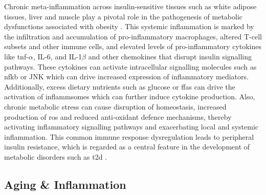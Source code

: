 \par Chronic meta-inflammation across insulin-sensitive tissues such as white adipose tissues, liver and muscle play a pivotal role in the pathogenesis of metabolic dysfunctions associated with obesity \textbf{\cite{gregor_inflammatory_2011,hotamisligil_inflammation_2017}}. This systemic inflammation is marked by the infiltration and accumulation of pro-inflammatory macrophages, altered T-cell subsets and other immune cells, and elevated levels of pro-inflammatory cytokines like \gls{tnf}-$\alpha$, IL-6, and IL-1$\beta$ and other chemokines that disrupt insulin signalling pathways. These cytokines can activate intracellular signalling molecules such as \gls{nfkb} or JNK which can drive increased expression of inflammatory mediators. Additionally, excess dietary nutrients such as glucose or \glspl{ffa} can drive the activation of inflammsomes which can further induce cytokine production. Also, chronic metabolic stress can cause disruption of  homeostasis, increased production of \gls{ros} and reduced anti-oxidant defence mechanisms, thereby activating inflammatory signalling pathways and exacerbating local and systemic inflammation. This common immune response dysregulation leads to peripheral insulin resistance, which is regarded as a central feature in the development of metabolic disorders such as \gls{t2d} \textbf{\cite{greenberg_obesity_2006,wu_metabolic_2020,luo_inflammation_2020,kawai_adipose_2021,kim_metabolic_2021,rohm_inflammation_2022,wu_skeletal_nodate}}.

\subsection{Aging \& Inflammation}
\label{sec:immune_aging}

